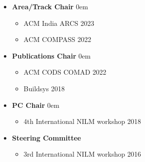 \documentclass[letter,10pt]{article}
\begin{document}
\begin{itemize}
\itemsep0em 

 \item[] \textbf{Area/Track Chair}
\itemsep0em 
    \begin{itemize}
    \item ACM India ARCS 2023
    \item ACM COMPASS 2022
    \end{itemize}
 \item[] \textbf{Publications Chair}
\itemsep0em 
    \begin{itemize}
    \item ACM CODS COMAD 2022
        \item Buildsys 2018
    \end{itemize}

    \item[] \textbf{PC Chair}
\itemsep0em 
    \begin{itemize}
        \item 4th International NILM workshop 2018
    \end{itemize}
    
     \item[] \textbf{Steering Committee}
    \begin{itemize}
        \item 3rd International NILM workshop 2016
\end{itemize}

\end{itemize}
\end{document}
